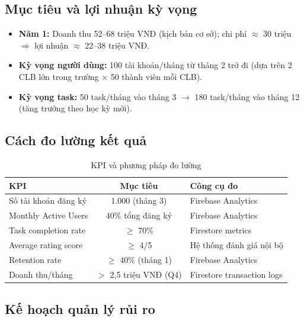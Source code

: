 \subsection{Mục tiêu và lợi nhuận kỳ vọng}

\begin{itemize}
  \item \textbf{Năm 1:} Doanh thu 52--68 triệu VNĐ (kịch bản cơ sở); chi phí $\approx$ 30 triệu
    $\Rightarrow$ lợi nhuận $\approx$ 22--38 triệu VNĐ.
  \item \textbf{Kỳ vọng người dùng:} 100 tài khoản/tháng từ tháng 2 trở đi (dựa trên
    2 CLB lớn trong trường $\times$ 50 thành viên mỗi CLB).
  \item \textbf{Kỳ vọng task:} 50 task/tháng vào tháng 3 $\rightarrow$ 180 task/tháng vào
    tháng 12 (tăng trưởng theo học kỳ mới).
\end{itemize}

\subsection{Cách đo lường kết quả}

\begin{table}[H]
\centering
\caption{KPI và phương pháp đo lường}
\begin{tabularx}{\textwidth}{|X|c|X|}
\hline
\textbf{KPI} & \textbf{Mục tiêu} & \textbf{Công cụ đo} \\
\hline
Số tài khoản đăng ký & 1.000 (tháng 3) & Firebase Analytics \\
\hline
Monthly Active Users & 40\% tổng đăng ký & Firebase Analytics \\
\hline
Task completion rate & $\geq$ 70\% & Firestore metrics \\
\hline
Average rating score & $\geq$ 4/5 & Hệ thống đánh giá nội bộ \\
\hline
Retention rate & $\geq$ 40\% (tháng 1) & Firebase Analytics \\
\hline
Doanh thu/tháng & $>$ 2,5 triệu VNĐ (Q4) & Firestore transaction logs \\
\hline
\end{tabularx}
\end{table}

\subsection{Kế hoạch quản lý rủi ro}

